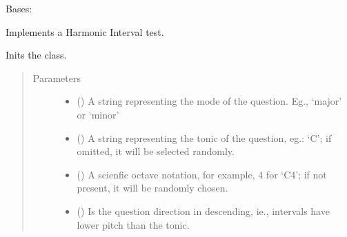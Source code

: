 \documentclass[letterpaper,10pt,english]{sphinxmanual}
\begin{document}
\begin{fulllineitems}
\label{\detokenize{index:birdears.questions.harmonicinterval.HarmonicIntervalQuestion}}
Bases: {\hyperref[\detokenize{index:birdears.questionbase.QuestionBase}]{}}

Implements a Harmonic Interval test.

\begin{fulllineitems}
\label{\detokenize{index:birdears.questions.harmonicinterval.HarmonicIntervalQuestion.__init__}}
Inits the class.
\begin{quote}\begin{description}
\item[{Parameters}] \leavevmode\begin{itemize}
\item {} 
 () \textendash{} A string representing the mode of the question.
Eg., ‘major’ or ‘minor’

\item {} 
 () \textendash{} A string representing the tonic of the question,
eg.: ‘C’; if omitted, it will be selected randomly.

\item {} 
 () \textendash{} A scienfic octave notation, for example, 4 for ‘C4’;
if not present, it will be randomly chosen.

\item {} 
 () \textendash{} Is the question direction in descending, ie.,
intervals have lower pitch than the tonic.


\end{itemize}
\end{description}
\end{quote}
\end{fulllineitems}
\end{fulllineitems}
\end{document}
